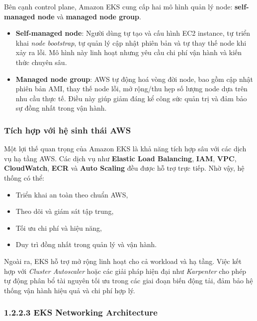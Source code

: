 Bên cạnh control plane, Amazon EKS cung cấp hai mô hình quản lý node: 
\textbf{self-managed node} và \textbf{managed node group}.

\begin{itemize}
    \item \textbf{Self-managed node}: Người dùng tự tạo và cấu hình EC2 instance, tự triển khai 
    \textit{node bootstrap}, tự quản lý cập nhật phiên bản và tự thay thế node khi xảy ra lỗi. 
    Mô hình này linh hoạt nhưng yêu cầu chi phí vận hành và kiến thức chuyên sâu.

    \item \textbf{Managed node group}: AWS tự động hoá vòng đời node, bao gồm cập nhật phiên bản 
    AMI, thay thế node lỗi, mở rộng/thu hẹp số lượng node dựa trên nhu cầu thực tế. 
    Điều này giúp giảm đáng kể công sức quản trị và đảm bảo sự đồng nhất trong vận hành.
\end{itemize}

\subsubsection*{Tích hợp với hệ sinh thái AWS}

Một lợi thế quan trọng của Amazon EKS là khả năng tích hợp sâu với các dịch vụ hạ tầng AWS. 
Các dịch vụ như \textbf{Elastic Load Balancing}, \textbf{IAM}, \textbf{VPC}, \textbf{CloudWatch}, 
\textbf{ECR} và \textbf{Auto Scaling} đều được hỗ trợ trực tiếp. Nhờ vậy, hệ thống có thể:

\begin{itemize}
    \item Triển khai an toàn theo chuẩn AWS,
    \item Theo dõi và giám sát tập trung,
    \item Tối ưu chi phí và hiệu năng,
    \item Duy trì đồng nhất trong quản lý và vận hành.
\end{itemize}

Ngoài ra, EKS hỗ trợ mở rộng linh hoạt cho cả workload và hạ tầng. Việc kết hợp với 
\textit{Cluster Autoscaler} hoặc các giải pháp hiện đại như \textit{Karpenter} cho phép tự động 
phân bổ tài nguyên tối ưu trong các giai đoạn biến động tải, đảm bảo hệ thống vận hành hiệu quả 
và chi phí hợp lý.

\subsubsection*{1.2.2.3 EKS Networking Architecture}

